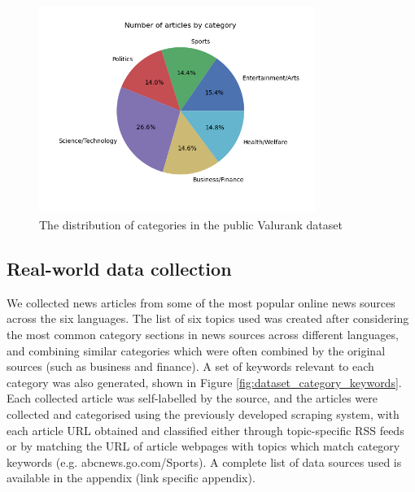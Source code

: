 \documentclass{l4proj}
\begin{document}
\begin{figure}[h]
\centering
\includegraphics[width=0.8\textwidth]{images/public-cats.png}
\caption{The distribution of categories in the public Valurank dataset}
\label{fig:public_cat_dist}
\end{figure}

\subsection{Real-world data collection} \hfill \par
We collected news articles from some of the most popular online news sources across the six languages. The list of six topics used was created after considering the most common category sections in news sources across different languages, and combining similar categories which were often combined by the original sources (such as business and finance). A set of keywords relevant to each category was also generated, shown in Figure \ref{fig:dataset_category_keywords}. Each collected article was self-labelled by the source, and the articles were collected and categorised using the previously developed scraping system, with each article URL obtained and classified either through topic-specific RSS feeds or by matching the URL of article webpages with topics which match category keywords (e.g. abcnews.go.com/Sports). A complete list of data sources used is available in the appendix (link specific appendix). \par
\end{document}

